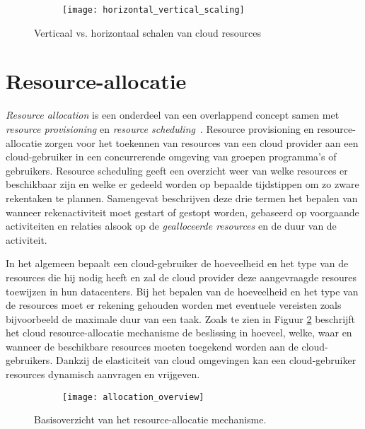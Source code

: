 \begin{figure}
	\centering
	\captionsetup{justification=centering}
	\begin{subfigure}{\textwidth}
		\centering
		\centerline{
			\texttt{[image: horizontal\_vertical\_scaling]}
		}
	\end{subfigure}
	\caption{Verticaal vs. horizontaal schalen van cloud resources}
	\label{fig:scaling2}
\end{figure}

\section{Resource-allocatie}
\label{sec:res_allocation}

\textit{Resource allocation} is een onderdeel van een overlappend concept samen met \textit{resource provisioning} en \textit{resource scheduling}~\cite{Yousafzai2016}. Resource provisioning en resource-allocatie zorgen voor het toekennen van resources van een cloud provider aan een cloud-gebruiker in een concurrerende omgeving van groepen programma's of gebruikers. Resource scheduling geeft een overzicht weer van welke resources er beschikbaar zijn en welke er gedeeld worden op bepaalde tijdstippen om zo zware rekentaken te plannen. Samengevat beschrijven deze drie termen het bepalen van wanneer rekenactiviteit moet gestart of gestopt worden, gebaseerd op voorgaande activiteiten en relaties alsook op de \textit{gealloceerde resources} en de duur van de activiteit.

In het algemeen bepaalt een cloud-gebruiker de hoeveelheid en het type van de resources die hij nodig heeft en zal de cloud provider deze aangevraagde resoures toewijzen in hun datacenters. Bij het bepalen van de hoeveelheid en het type van de resources moet er rekening gehouden worden met eventuele vereisten zoals bijvoorbeeld de maximale duur van een taak. Zoals te zien in Figuur \ref{fig:allocation1} beschrijft het cloud resource-allocatie mechanisme de beslissing in hoeveel, welke, waar en wanneer de beschikbare resources moeten toegekend worden aan de cloud-gebruikers. Dankzij de elasticiteit van cloud omgevingen kan een cloud-gebruiker resources dynamisch aanvragen en vrijgeven.

\begin{figure}
	\centering
	\captionsetup{justification=centering}
	\begin{subfigure}{\textwidth}
		\centering
		\centerline{
			\texttt{[image: allocation\_overview]}
		}
	\end{subfigure}
	\caption{Basisoverzicht van het resource-allocatie mechanisme.}
	\label{fig:allocation1}
\end{figure}

